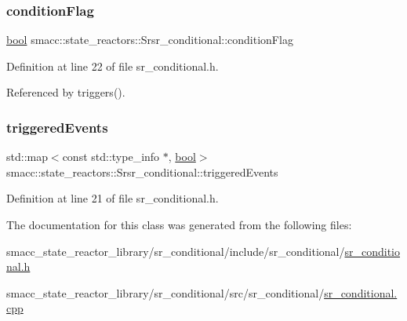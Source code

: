\subsubsection{\texorpdfstring{condition\+Flag}{conditionFlag}}
{\footnotesize\ttfamily \hyperlink{classbool}{bool} smacc\+::state\+\_\+reactors\+::\+Srsr\+\_\+conditional\+::condition\+Flag\hspace{0.3cm}{\ttfamily [private]}}



Definition at line 22 of file sr\+\_\+conditional.\+h.



Referenced by triggers().

\mbox{\label{classsmacc_1_1state__reactors_1_1Srsr__conditional_ae2085e1ecd80a2d07e1c97ed6499b210}} 
\subsubsection{\texorpdfstring{triggered\+Events}{triggeredEvents}}
{\footnotesize\ttfamily std\+::map$<$const std\+::type\+\_\+info $\ast$, \hyperlink{classbool}{bool}$>$ smacc\+::state\+\_\+reactors\+::\+Srsr\+\_\+conditional\+::triggered\+Events\hspace{0.3cm}{\ttfamily [private]}}



Definition at line 21 of file sr\+\_\+conditional.\+h.



The documentation for this class was generated from the following files\+:\begin{DoxyCompactItemize}
\item 
smacc\+\_\+state\+\_\+reactor\+\_\+library/sr\+\_\+conditional/include/sr\+\_\+conditional/\hyperlink{sr__conditional_8h}{sr\+\_\+conditional.\+h}\item 
smacc\+\_\+state\+\_\+reactor\+\_\+library/sr\+\_\+conditional/src/sr\+\_\+conditional/\hyperlink{sr__conditional_8cpp}{sr\+\_\+conditional.\+cpp}\end{DoxyCompactItemize}
